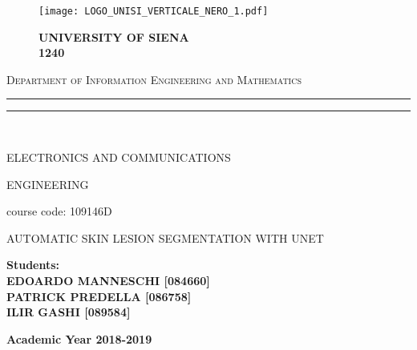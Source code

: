 \documentclass[12pt,a4paper,oneside]{report} %
\begin{document}
\begin{titlepage}

\begin{figure}[ht]                       %
\begin{center}   

\texttt{[image: LOGO\_UNISI\_VERTICALE\_NERO\_1.pdf]}
\end{center}
\begin{center}   

{{\Large{\textbf{UNIVERSITY OF SIENA\\}}}}
{{\Large{\textbf{1240}}}}
\end{center}
\end{figure}

\begin{center}

{{\Large{\textsc{Department of Information Engineering and Mathematics}}}}
\rule[0.1cm]{12cm}{0.1mm}
\rule[0.5cm]{12cm}{0.6mm}
\renewcommand*\rmdefault{cmss}
\\{{\LARGE{ELECTRONICS AND COMMUNICATIONS 
\vspace{0.01mm}\begin{center}ENGINEERING\end{center}}}}
\end{center}
\begin{center}course code: 109146D\end{center}


\vspace{1mm}
\begin{center}
\begin{huge}
AUTOMATIC SKIN LESION SEGMENTATION WITH UNET \\%
\end{huge}
\end{center}
\vspace{21mm}
\par
\noindent
\hfill
\begin{minipage}[t]{0.68\textwidth}\raggedleft
{\large{\bf Students:\\
EDOARDO MANNESCHI [084660]\\
PATRICK PREDELLA [086758]\\
ILIR GASHI [089584]\\}}
\end{minipage}
\vspace{5mm} %
\vfill
\begin{center}
{\large{\bf 
Academic Year 2018-2019}}%
\end{center}
\end{titlepage}
\end{document}
